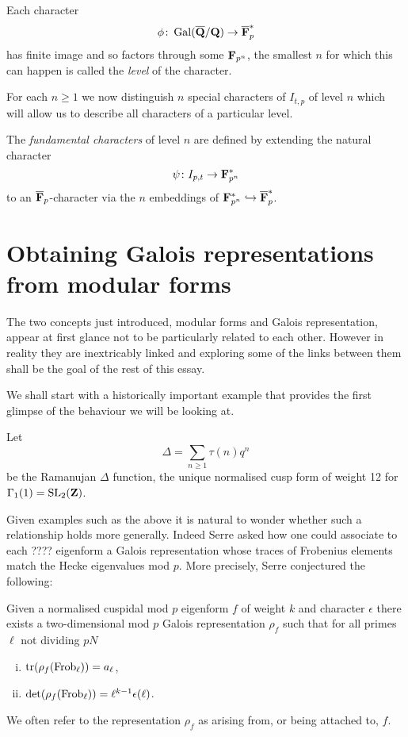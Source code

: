 \documentclass[a4paper,12pt]{article}
\begin{document}
\begin{defn}
Each character
\[
\phi \colon \operatorname{Gal}(\overline{\mathbf{Q}}/\mathbf{Q}) \to \overline{\mathbf{F}}_p^*
\]
has finite image and so factors through some $\mathbf{F}_{p^n}$, the smallest $n$ for which this can happen is called the \emph{level} of the character.
\end{defn}

For each $n \ge 1$ we now distinguish $n$ special characters of $I_{t,p}$ of level $n$ which will allow us to describe all characters of a particular level.

\begin{defn}\label{def-fund}
The \emph{fundamental characters} of level $n$ are defined by extending the natural character
\[
\psi\colon I_{p,t} \to \mathbf{F}_{p^n}^*
\]
to an $\overline{\mathbf{F}}_p$-character via the $n$ embeddings of $\mathbf{F}_{p^n}^* \hookrightarrow \overline{\mathbf{F}}_p^*$. %
\end{defn}




\section{Obtaining Galois representations from modular forms}
The two concepts just introduced, modular forms and Galois representation, appear at first glance not to be particularly related to each other.
However in reality they are inextricably linked and exploring some of the links between them shall be the goal of the rest of this essay.

We shall start with a historically important example that provides the first glimpse of the behaviour we will be looking at.

\begin{ex}\label{ex-delt}
Let
\[
\Delta = \sum_{n \ge 1} \tau(n) q^n
\]
be the Ramanujan $\Delta$ function, the unique normalised cusp form of weight 12 for $\Gamma_1(1) = \operatorname{SL}_2(\mathbf{Z})$.
\end{ex}

Given examples such as the above it is natural to wonder whether such a relationship holds more generally.
Indeed Serre asked how one could associate to each ???? eigenform a Galois representation whose traces of Frobenius elements match the Hecke eigenvalues mod $p$.
More precisely, Serre conjectured the following: %

\begin{thm}\label{thm-assoc}
Given a normalised cuspidal mod $p$ eigenform $f$ of weight $k$ and character $\epsilon$ there exists a two-dimensional mod $p$ Galois representation $\rho_f$ such that for all primes $\ell$ not dividing $pN$ %
\begin{enumerate}[(i)]
\item $\operatorname{tr}(\rho_f (\operatorname{Frob}_\ell)) = a_\ell$,
\item $\det(\rho_f (\operatorname{Frob}_\ell)) = \ell^{k-1}\epsilon(\ell)$. %
\end{enumerate}
We often refer to the representation $\rho_f$ as arising from, or being attached to, $f$.
\end{thm}
\end{document}
